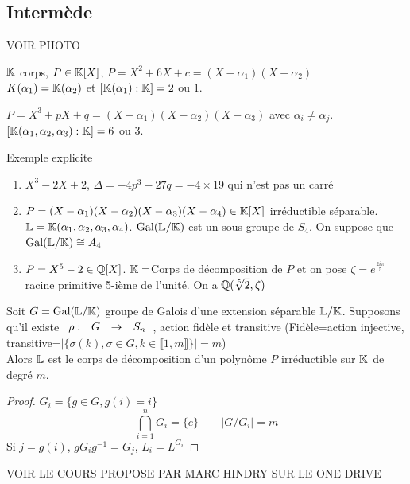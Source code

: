 \documentclass[]{report}
\begin{document}
    \subsection*{Intermède}

    VOIR PHOTO

    \begin{ex}{}{}
        $\mathbb{K}$ corps, $P\in \mathbb{K}[X]$, $P=X^2+6X+c=(X-\alpha_1)(X-\alpha_2)$\\
        $K(\alpha_1)=\mathbb{K}(\alpha_2)$ et $[\mathbb{K}(\alpha_1):\mathbb{K}]=2$ ou $1$.
    \end{ex}

    \begin{ex}{}{}
        $P=X^3+pX+q=(X-\alpha_1)(X-\alpha_2)(X-\alpha_3)$ avec $\alpha_i\neq \alpha_j$.\\
        $[\mathbb{K}(\alpha_1,\alpha_2,\alpha_3):\mathbb{K}]=6$ ou $3$.
    \end{ex}

    \begin{ex}{Exemple explicite}{}
        \begin{enumerate}
            \item $X^3-2X+2$, $\Delta=-4p^3-27q=-4\times 19$ qui n'est pas un carré
            \item $P=(X-\alpha_1)(X-\alpha_2)(X-\alpha_3)(X-\alpha_4)\in \mathbb{K}[X]$ irréductible séparable. $\mathbb{L}=\mathbb{K}(\alpha_1,\alpha_2,\alpha_3,\alpha_4)$. $\text{Gal}(\mathbb{L}/\mathbb{K})$ est un sous-groupe de $S_4$. On suppose que $\text{Gal}(\mathbb{L}/\mathbb{K})\cong A_4$
            \item $P=X^5-2\in \mathbb{Q}[X]$. $\mathbb{K}=$Corps de décomposition de $P$ et on pose $\zeta=e^{\frac{2i\pi}{5}}$ racine primitive 5-ième de l'unité. On a $\mathbb{Q}(\sqrt[5]{2},\zeta)$
        \end{enumerate}
    \end{ex}

    \begin{prop}{}{}
        Soit $G=\text{Gal}(\mathbb{L}/\mathbb{K})$ groupe de Galois d'une extension séparable $\mathbb{L}/\mathbb{K}$. Supposons qu'il existe $\begin{array}{ccccc} \rho : & G & \to & S_n \end{array}$, action fidèle et transitive (Fidèle=action injective, transitive=$|\{\sigma(k),\sigma\in G,k\in \llbracket 1,m\rrbracket\}|=m$)\\
        Alors $\mathbb{L}$ est le corps de décomposition d'un polynôme $P$ irréductible sur $\mathbb{K}$ de degré $m$.
    \end{prop}

    \begin{proof}
        $G_i=\{g\in G,g(i)=i\}$
        \[\bigcap_{i=1}^n G_i=\{e\}\qquad \left| G/G_i\right|=m\]
        Si $j=g(i)$, $gG_i g^{-1}=G_j$, $L_i=L^{G_i}$
    \end{proof}

    VOIR LE COURS PROPOSE PAR MARC HINDRY SUR LE ONE DRIVE
\end{document}
